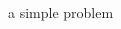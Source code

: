 \documentclass[a4paper]{article}
\begin{document}
\blindtext

\begin{figure}[h]
\centering
\begin{godiagram}[19]{8cm}
\end{godiagram}
\caption{a simple problem}
\end{figure}

\blindtext
\end{document}
